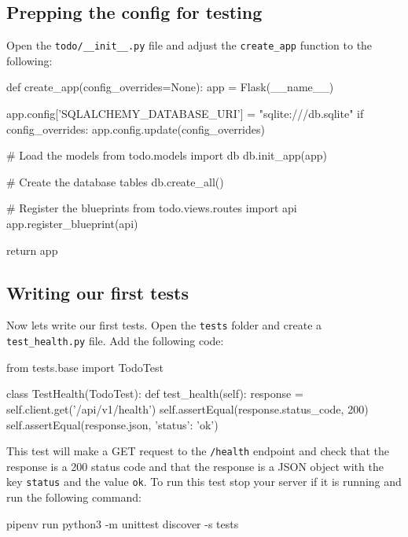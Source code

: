 \documentclass{csse4400}
\begin{document}
\subsection{Prepping the config for testing}

Open the \texttt{todo/\_\_init\_\_.py} file and adjust the \texttt{create\_app} function to the following:

\begin{code}[language=python,numbers=none]{}
  def create_app(config_overrides=None):
      app = Flask(__name__)

      app.config['SQLALCHEMY_DATABASE_URI'] = "sqlite:///db.sqlite"
      if config_overrides:
          app.config.update(config_overrides)

      # Load the models
      from todo.models import db
      db.init_app(app)

      # Create the database tables
      db.create_all()

      # Register the blueprints
      from todo.views.routes import api
      app.register_blueprint(api)

      return app
\end{code}

\subsection{Writing our first tests}

Now lets write our first tests. Open the \texttt{tests} folder and create a \texttt{test\_health.py} file. Add the following code:

\begin{code}[language=python,numbers=none]{}
  from tests.base import TodoTest
  
  
  class TestHealth(TodoTest):
      def test_health(self):
          response = self.client.get('/api/v1/health')
          self.assertEqual(response.status_code, 200)
          self.assertEqual(response.json, {'status': 'ok'})

\end{code}

This test will make a GET request to the \texttt{/health} endpoint and check that the response is a 200 status code and that the response is a JSON object with the key \texttt{status} and the value \texttt{ok}. To run this test stop your server if it is running and run the following command:

\begin{code}[language=bash,numbers=none]{}
  pipenv run python3 -m unittest discover -s tests
\end{code}
\end{document}
